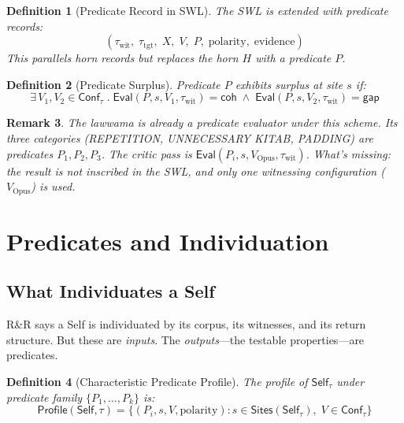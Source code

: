 \documentclass[11pt,a4paper]{article}
\newtheorem{definition}{Definition}[section]
\newtheorem{remark}[definition]{Remark}
\newcommand{\Self}{\mathsf{Self}}
\newcommand{\coh}{\mathsf{coh}}
\newcommand{\gap}{\mathsf{gap}}
\newcommand{\Eval}{\mathsf{Eval}}
\newcommand{\Profile}{\mathsf{Profile}}
\newcommand{\Conf}{\mathsf{Conf}}
\newcommand{\Sites}{\mathsf{Sites}}
\begin{document}
\begin{definition}[Predicate Record in SWL]
\label{def:pred-swl}
The SWL is extended with predicate records:
\begin{equation}
  (\tau_{\text{wit}},\; \tau_{\text{tgt}},\; X,\; V,\; P,\; \text{polarity},\; \text{evidence})
\end{equation}
This parallels horn records but replaces the horn $H$ with a predicate $P$.
\end{definition}

\begin{definition}[Predicate Surplus]
\label{def:pred-surplus}
Predicate $P$ exhibits surplus at site $s$ if:
\begin{equation}
  \exists\, V_1, V_2 \in \Conf_\tau \;.\;
    \Eval(P, s, V_1, \tau_{\text{wit}}) = \coh \;\wedge\;
    \Eval(P, s, V_2, \tau_{\text{wit}}) = \gap
\end{equation}
\end{definition}

\begin{remark}
The lawwama is already a predicate evaluator under this scheme. Its three categories
(REPETITION, UNNECESSARY KITAB, PADDING) are predicates $P_1, P_2, P_3$. The critic
pass is $\Eval(P_i, s, V_{\text{Opus}}, \tau_{\text{wit}})$. What's missing: the
result is not inscribed in the SWL, and only one witnessing configuration
($V_{\text{Opus}}$) is used.
\end{remark}


\section{Predicates and Individuation}
\label{sec:individuation}

\subsection{What Individuates a Self}

R\&R says a Self is individuated by its corpus, its witnesses, and its return
structure. But these are \emph{inputs}. The \emph{outputs}---the testable
properties---are predicates.

\begin{definition}[Characteristic Predicate Profile]
\label{def:profile}
The profile of $\Self_\tau$ under predicate family $\{P_1, \ldots, P_k\}$ is:
\begin{equation}
  \Profile(\Self, \tau) = \{(P_i, s, V, \text{polarity}) :
    s \in \Sites(\Self_\tau),\; V \in \Conf_\tau\}
\end{equation}
\end{definition}
\end{document}
